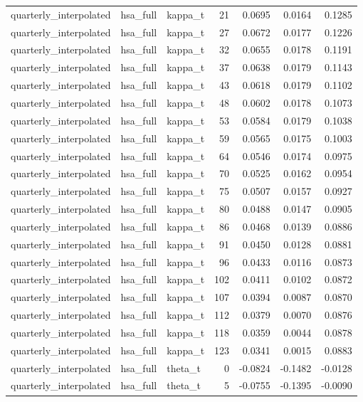 \begin{tabular}{lllrrrr}
quarterly\_interpolated & hsa\_full & kappa\_t & 21 & 0.0695 & 0.0164 & 0.1285 \\
quarterly\_interpolated & hsa\_full & kappa\_t & 27 & 0.0672 & 0.0177 & 0.1226 \\
quarterly\_interpolated & hsa\_full & kappa\_t & 32 & 0.0655 & 0.0178 & 0.1191 \\
quarterly\_interpolated & hsa\_full & kappa\_t & 37 & 0.0638 & 0.0179 & 0.1143 \\
quarterly\_interpolated & hsa\_full & kappa\_t & 43 & 0.0618 & 0.0179 & 0.1102 \\
quarterly\_interpolated & hsa\_full & kappa\_t & 48 & 0.0602 & 0.0178 & 0.1073 \\
quarterly\_interpolated & hsa\_full & kappa\_t & 53 & 0.0584 & 0.0179 & 0.1038 \\
quarterly\_interpolated & hsa\_full & kappa\_t & 59 & 0.0565 & 0.0175 & 0.1003 \\
quarterly\_interpolated & hsa\_full & kappa\_t & 64 & 0.0546 & 0.0174 & 0.0975 \\
quarterly\_interpolated & hsa\_full & kappa\_t & 70 & 0.0525 & 0.0162 & 0.0954 \\
quarterly\_interpolated & hsa\_full & kappa\_t & 75 & 0.0507 & 0.0157 & 0.0927 \\
quarterly\_interpolated & hsa\_full & kappa\_t & 80 & 0.0488 & 0.0147 & 0.0905 \\
quarterly\_interpolated & hsa\_full & kappa\_t & 86 & 0.0468 & 0.0139 & 0.0886 \\
quarterly\_interpolated & hsa\_full & kappa\_t & 91 & 0.0450 & 0.0128 & 0.0881 \\
quarterly\_interpolated & hsa\_full & kappa\_t & 96 & 0.0433 & 0.0116 & 0.0873 \\
quarterly\_interpolated & hsa\_full & kappa\_t & 102 & 0.0411 & 0.0102 & 0.0872 \\
quarterly\_interpolated & hsa\_full & kappa\_t & 107 & 0.0394 & 0.0087 & 0.0870 \\
quarterly\_interpolated & hsa\_full & kappa\_t & 112 & 0.0379 & 0.0070 & 0.0876 \\
quarterly\_interpolated & hsa\_full & kappa\_t & 118 & 0.0359 & 0.0044 & 0.0878 \\
quarterly\_interpolated & hsa\_full & kappa\_t & 123 & 0.0341 & 0.0015 & 0.0883 \\
quarterly\_interpolated & hsa\_full & theta\_t & 0 & -0.0824 & -0.1482 & -0.0128 \\
quarterly\_interpolated & hsa\_full & theta\_t & 5 & -0.0755 & -0.1395 & -0.0090 \\

\end{tabular}
